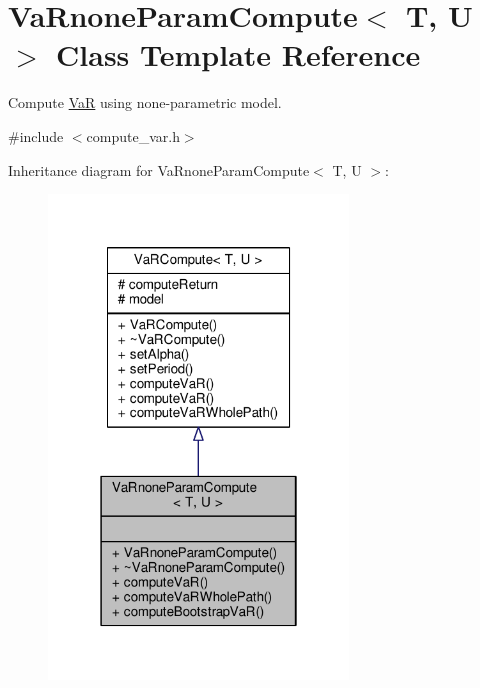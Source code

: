 \hypertarget{classVaRnoneParamCompute}{}\section{Va\+Rnone\+Param\+Compute$<$ T, U $>$ Class Template Reference}
\label{classVaRnoneParamCompute}


Compute \hyperlink{classVaR}{VaR} using none-\/parametric model.  




{\ttfamily \#include $<$compute\+\_\+var.\+h$>$}



Inheritance diagram for Va\+Rnone\+Param\+Compute$<$ T, U $>$\+:
\nopagebreak
\begin{figure}[H]
\begin{center}
\leavevmode
\includegraphics[width=226pt]{classVaRnoneParamCompute__inherit__graph}
\end{center}
\end{figure}


